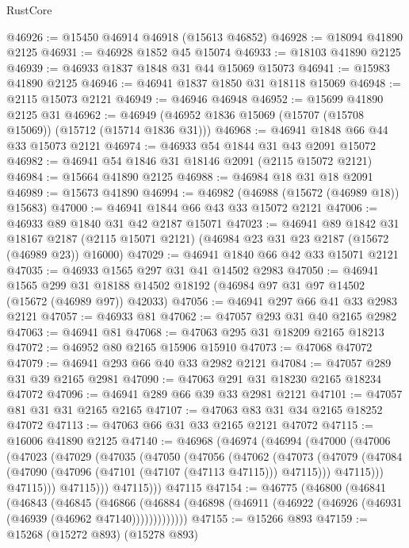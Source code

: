 \begin{lexlean}{RustCore}
\begin{coremodule}
@46926 := @15450 @46914 @46918 (@15613 @46852)
@46928 := @18094 @41890 @2125
@46931 := @46928 @1852 @45 @15074
@46933 := @18103 @41890 @2125
@46939 := @46933 @1837 @1848 @31 @44 @15069 @15073
@46941 := @15983 @41890 @2125
@46946 := @46941 @1837 @1850 @31 @18118 @15069
@46948 := @2115 @15073 @2121
@46949 := @46946 @46948
@46952 := @15699 @41890 @2125 @31
@46962 := @46949 (@46952 @1836 @15069 (@15707 (@15708 @15069)) (@15712 (@15714 @1836 @31)))
@46968 := @46941 @1848 @66 @44 @33 @15073 @2121
@46974 := @46933 @54 @1844 @31 @43 @2091 @15072
@46982 := @46941 @54 @1846 @31 @18146 @2091 (@2115 @15072 @2121)
@46984 := @15664 @41890 @2125
@46988 := @46984 @18 @31 @18 @2091
@46989 := @15673 @41890
@46994 := @46982 (@46988 (@15672 (@46989 @18)) @15683)
@47000 := @46941 @1844 @66 @43 @33 @15072 @2121
@47006 := @46933 @89 @1840 @31 @42 @2187 @15071
@47023 := @46941
    @89
    @1842
    @31
    @18167
    @2187
    (@2115 @15071 @2121)
    (@46984 @23 @31 @23 @2187 (@15672 (@46989 @23)) @16000)
@47029 := @46941 @1840 @66 @42 @33 @15071 @2121
@47035 := @46933 @1565 @297 @31 @41 @14502 @2983
@47050 := @46941
    @1565
    @299
    @31
    @18188
    @14502
    @18192
    (@46984 @97 @31 @97 @14502 (@15672 (@46989 @97)) @42033)
@47056 := @46941 @297 @66 @41 @33 @2983 @2121
@47057 := @46933 @81
@47062 := @47057 @293 @31 @40 @2165 @2982
@47063 := @46941 @81
@47068 := @47063 @295 @31 @18209 @2165 @18213
@47072 := @46952 @80 @2165 @15906 @15910
@47073 := @47068 @47072
@47079 := @46941 @293 @66 @40 @33 @2982 @2121
@47084 := @47057 @289 @31 @39 @2165 @2981
@47090 := @47063 @291 @31 @18230 @2165 @18234 @47072
@47096 := @46941 @289 @66 @39 @33 @2981 @2121
@47101 := @47057 @81 @31 @31 @2165 @2165
@47107 := @47063 @83 @31 @34 @2165 @18252 @47072
@47113 := @47063 @66 @31 @33 @2165 @2121 @47072
@47115 := @16006 @41890 @2125
@47140 := @46968
    (@46974
      (@46994
        (@47000
          (@47006
            (@47023
              (@47029
                (@47035
                  (@47050
                    (@47056
                      (@47062
                        (@47073
                          (@47079
                            (@47084 (@47090 (@47096 (@47101 (@47107 (@47113 @47115))) @47115)))
                            @47115)))
                      @47115)))
                @47115)))
          @47115)))
    @47115
@47154 := @46775
    (@46800
      (@46841
        (@46843
          (@46845
            (@46866
              (@46884 (@46898 (@46911 (@46922 (@46926 (@46931 (@46939 (@46962 @47140)))))))))))))
@47155 := @15266 @893
@47159 := @15268 (@15272 @893) (@15278 @893)

\end{coremodule}
\end{lexlean}

